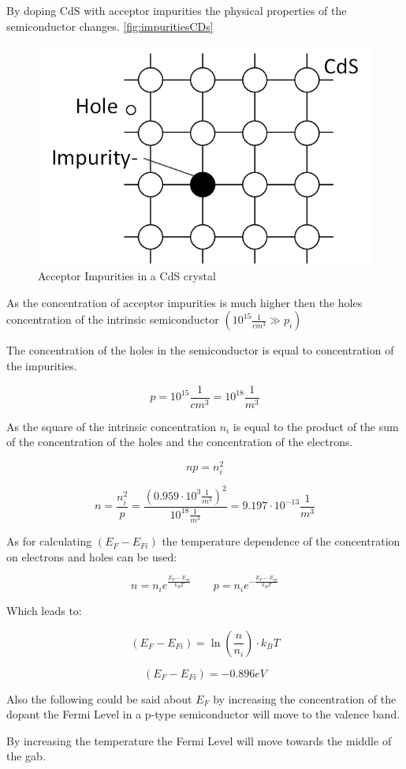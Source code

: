 By doping CdS with acceptor impurities the physical properties of the
semiconductor changes. \autoref{fig:impuritiesCDs}

\begin{figure}[H]
  \centering
  \includegraphics[width=0.5\linewidth]{Graphics/Chapter3/impurity_Cds.png}
  \caption{Acceptor Impurities in a CdS crystal}
  \label{fig:impuritiesCds}
\end{figure}

As the concentration of acceptor impurities is much higher then
the holes concentration of the intrinsic semiconductor 
$(10^{15} \frac{1}{cm^3} \gg p_i)$

The concentration of the holes in the semiconductor is equal to concentration
of the impurities.

$$p = 10^{15} \frac{1}{cm^3} = 10^{18} \frac{1}{m^3}$$

As the square of the intrinsic concentration $n_i$ is equal to the product
of the sum of the concentration of the holes and the concentration of the
electrons.

$$np = n_i^2$$

$$n = \frac{n_i^2}{p} = \frac{(0.959 \cdot 10^3 \frac{1}{m^3})^2}{10^{18} \frac{1}{m^3}} = 9.197 \cdot 10^{-13} \frac{1}{m^3}$$

As for calculating $(E_F-E_{Fi})$ the temperature dependence of the
concentration on electrons and holes can be used:

$$n = n_i e^{\frac{E_F-E_{Fi}}{k_BT}}  \qquad p = n_i e^{-\frac{E_F-E_{Fi}}{k_BT}}$$

Which leads to:

$$(E_F-E_{Fi}) = \ln\left( \frac{n}{n_i} \right) \cdot k_BT$$

$$(E_F-E_{Fi}) = -0.896 eV $$

Also the following could be said about $E_F$
by increasing the concentration of the dopant 
the Fermi Level in a p-type semiconductor will
move to the valence band.

By increasing the temperature the Fermi Level
will move towards the middle of the gab.

